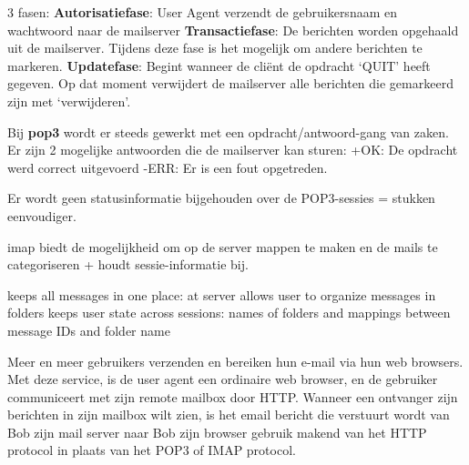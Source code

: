 3 fasen:
\be
\itf \textbf{Autorisatiefase}: User Agent verzendt de gebruikersnaam en wachtwoord naar de mailserver
\itf \textbf{Transactiefase}: De berichten worden opgehaald uit de mailserver. Tijdens deze fase is het mogelijk om andere berichten te markeren.
\itf \textbf{Updatefase}: Begint wanneer de cliënt de opdracht ‘QUIT’ heeft gegeven. Op dat moment verwijdert de mailserver alle berichten die gemarkeerd zijn met ‘verwijderen’.
\ee

\noindent Bij \textbf{\acrshort{pop3}} wordt er steeds gewerkt met een opdracht/antwoord-gang van zaken. Er zijn 2 mogelijke antwoorden die de mailserver kan sturen:
\bi
\itf +OK: De opdracht werd correct uitgevoerd
\itf -ERR: Er is een fout opgetreden.
\ei

\noindent Er wordt geen statusinformatie bijgehouden over de POP3-sessies = stukken eenvoudiger.


\acrshort{imap} biedt de mogelijkheid om op de server mappen te maken en de mails te categoriseren + houdt sessie-informatie bij.

\bi
\itf keeps all messages in one place: at server
\itf allows user to organize messages in folders
\itf keeps user state across sessions:
\bi
\itf names of folders and mappings between message IDs and folder name
\ei
\ei


Meer en meer gebruikers verzenden en bereiken hun e-mail via hun web browsers. Met deze service, is de user agent een ordinaire web browser, en de gebruiker communiceert met zijn remote mailbox door HTTP. Wanneer een ontvanger zijn berichten in zijn mailbox wilt zien, is het email bericht die verstuurt wordt van Bob zijn mail server naar Bob zijn browser gebruik makend van het HTTP protocol in plaats van het POP3 of IMAP protocol.
